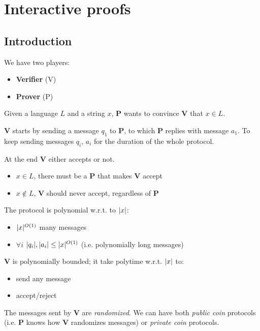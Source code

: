 \section{Interactive proofs}

\subsection{Introduction}\label{subsec:ip_intro}
    \def\prover{\textbf{P} }
    \def\verifier{\textbf{V} }

    We have two players:
    \begin{itemize}
        \item \textbf{Verifier} (V)
        \item \textbf{Prover} (P)
    \end{itemize}

    Given a language $L$ and a string $x$, \prover wants to convince \verifier that $x \in L$.

    \verifier starts by sending a message $q_1$ to \textbf{P}, to which \prover replies with message $a_1$.
    To keep sending messages $q_i$, $a_i$ for the duration of the whole protocol.

    At the end \verifier either accepts or not.
    \begin{itemize}
        \item $x \in L$, there must be a \prover that makes \verifier accept
        \item $x \not\in L$, \verifier should never accept, regardless of \prover
    \end{itemize}

    The protocol is polynomial w.r.t. to $\vert x \vert$:
    \begin{itemize}
        \item $\vert x \vert^{O(1)}$ many messages
        \item $\forall i$ $\vert q_i \vert, \vert a_i \vert \leq \vert x \vert^{O(1)}$ (i.e. polynomially long messages)
    \end{itemize}

    \verifier is polynomially bounded; it take polytime w.r.t. $\vert x \vert$ to:
    \begin{itemize}
        \item send any message
        \item accept/reject
    \end{itemize}

    The messages sent by \verifier are \textit{randomized}.
    We can have both \textit{public coin} protocols (i.e. \prover knows how \verifier randomizes messages) or \textit{private coin} protocols.

